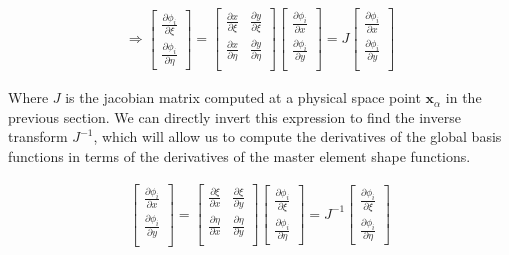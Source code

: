 \documentclass[10pt]{article}
\begin{document}
\begingroup
\renewcommand*{\arraystretch}{1.5}
\begin{align}
  \Rightarrow
  \begin{bmatrix}
    \frac{\partial \phi_i}{\partial \xi} \\
    \frac{\partial \phi_i}{\partial \eta}
  \end{bmatrix}
  =
  \begin{bmatrix}
    \frac{\partial x}{\partial \xi} & \frac{\partial y}{\partial \xi} \\
    \frac{\partial x}{\partial \eta} & \frac{\partial y}{\partial \eta} \\
  \end{bmatrix}
  \begin{bmatrix}
    \frac{\partial \phi_i}{\partial x} \\
    \frac{\partial \phi_i}{\partial y} \\
  \end{bmatrix}
  =J
  \begin{bmatrix}
    \frac{\partial \phi_i}{\partial x} \\
    \frac{\partial \phi_i}{\partial y} \\
  \end{bmatrix}
\end{align}
\endgroup

Where $J$ is the jacobian matrix computed at a physical space point $\bm{x}_\alpha$ in the previous
section. We can directly invert this expression to find the inverse transform $J^{-1}$, which will
allow us to compute the derivatives of the global basis functions in terms of the derivatives of the
master element shape functions.

\begingroup
\renewcommand*{\arraystretch}{1.5}
\begin{align}
  \begin{bmatrix}
    \frac{\partial \phi_i}{\partial x} \\
    \frac{\partial \phi_i}{\partial y} \\
  \end{bmatrix}
  =
  \begin{bmatrix}
    \frac{\partial \xi}{\partial x} & \frac{\partial \xi}{\partial y} \\
    \frac{\partial \eta}{\partial x} & \frac{\partial \eta}{\partial y} \\
  \end{bmatrix}
  \begin{bmatrix}
    \frac{\partial \phi_i}{\partial \xi} \\
    \frac{\partial \phi_i}{\partial \eta}
  \end{bmatrix}
  =J^{-1}
  \begin{bmatrix}
    \frac{\partial \phi_i}{\partial \xi} \\
    \frac{\partial \phi_i}{\partial \eta}
  \end{bmatrix}
\end{align}
\endgroup
\end{document}

